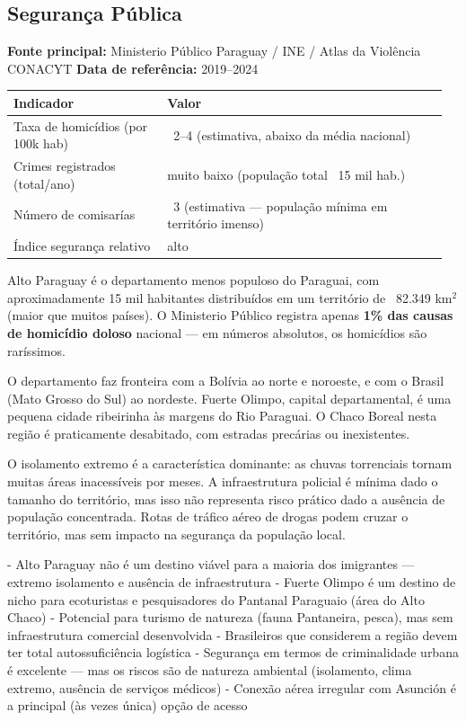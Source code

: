 \subsection{Segurança Pública}

\textbf{Fonte principal:} Ministerio Público Paraguay / INE / Atlas da Violência CONACYT
\textbf{Data de referência:} 2019--2024


{\small
\setlength{\tabcolsep}{3pt}
\renewcommand{\arraystretch}{1.12}
\begin{tabularx}{\linewidth}{>{\raggedright\arraybackslash}p{0.34\linewidth} >{\raggedright\arraybackslash}p{0.62\linewidth}}
\toprule
Indicador & Valor \\
\midrule
Taxa de homicídios (por 100k hab) & ~2--4 (estimativa, abaixo da média nacional) \\
Crimes registrados (total/ano) & muito baixo (população total ~15 mil hab.) \\
Número de comisarías & ~3 (estimativa --- população mínima em território imenso) \\
Índice segurança relativo & alto \\
\bottomrule
\end{tabularx}
}


Alto Paraguay é o departamento menos populoso do Paraguai, com aproximadamente 15 mil habitantes distribuídos em um território de ~82.349 km$^2$ (maior que muitos países). O Ministerio Público registra apenas \textbf{1\% das causas de homicídio doloso} nacional --- em números absolutos, os homicídios são raríssimos.

O departamento faz fronteira com a Bolívia ao norte e noroeste, e com o Brasil (Mato Grosso do Sul) ao nordeste. Fuerte Olimpo, capital departamental, é uma pequena cidade ribeirinha às margens do Rio Paraguai. O Chaco Boreal nesta região é praticamente desabitado, com estradas precárias ou inexistentes.

O isolamento extremo é a característica dominante: as chuvas torrenciais tornam muitas áreas inacessíveis por meses. A infraestrutura policial é mínima dado o tamanho do território, mas isso não representa risco prático dado a ausência de população concentrada. Rotas de tráfico aéreo de drogas podem cruzar o território, mas sem impacto na segurança da população local.


- Alto Paraguay não é um destino viável para a maioria dos imigrantes --- extremo isolamento e ausência de infraestrutura
- Fuerte Olimpo é um destino de nicho para ecoturistas e pesquisadores do Pantanal Paraguaio (área do Alto Chaco)
- Potencial para turismo de natureza (fauna Pantaneira, pesca), mas sem infraestrutura comercial desenvolvida
- Brasileiros que considerem a região devem ter total autossuficiência logística
- Segurança em termos de criminalidade urbana é excelente --- mas os riscos são de natureza ambiental (isolamento, clima extremo, ausência de serviços médicos)
- Conexão aérea irregular com Asunción é a principal (às vezes única) opção de acesso




